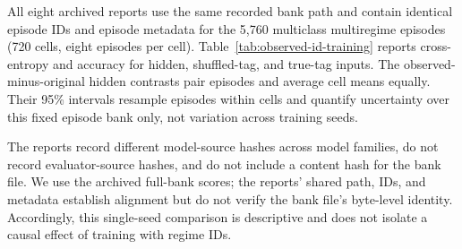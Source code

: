 \documentclass{article}
\begin{document}
All eight archived reports use the same recorded bank path and contain identical episode IDs and episode metadata for the 5,760 multiclass multiregime episodes (720 cells, eight episodes per cell). Table~\ref{tab:observed-id-training} reports cross-entropy and accuracy for hidden, shuffled-tag, and true-tag inputs. The observed-minus-original hidden contrasts pair episodes and average cell means equally. Their 95\% intervals resample episodes within cells and quantify uncertainty over this fixed episode bank only, not variation across training seeds.

The reports record different model-source hashes across model families, do not record evaluator-source hashes, and do not include a content hash for the bank file. We use the archived full-bank scores; the reports' shared path, IDs, and metadata establish alignment but do not verify the bank file's byte-level identity. Accordingly, this single-seed comparison is descriptive and does not isolate a causal effect of training with regime IDs.



\FloatBarrier
\end{document}
